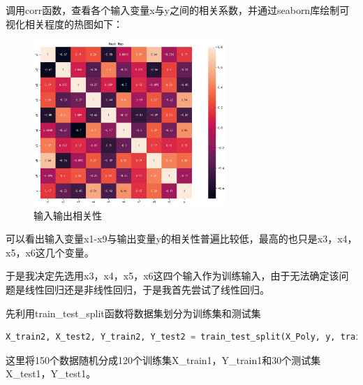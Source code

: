 \documentclass{source/Experiment}
\begin{document}
            调用corr函数，查看各个输入变量x与y之间的相关系数，并通过seaborn库绘制可视化相关程度的热图如下：
            \begin{figure}[H]
                \centering
                \includegraphics[width = 0.65\textwidth]{HeatMap}
                \caption{输入输出相关性}
            \end{figure}
            可以看出输入变量x1-x9与输出变量y的相关性普遍比较低，最高的也只是x3，x4，x5，x6这几个变量。

            于是我决定先选用x3，x4，x5，x6这四个输入作为训练输入，由于无法确定该问题是线性回归还是非线性回归，于是我首先尝试了线性回归。

            先利用train\_test\_split函数将数据集划分为训练集和测试集
            \begin{lstlisting}[language=Python]
X_train2, X_test2, Y_train2, Y_test2 = train_test_split(X_Poly, y, train_size=0.80, random_state=1)
            \end{lstlisting}

            这里将150个数据随机分成120个训练集X\_train1，Y\_train1和30个测试集X\_test1，Y\_test1。
\end{document}
